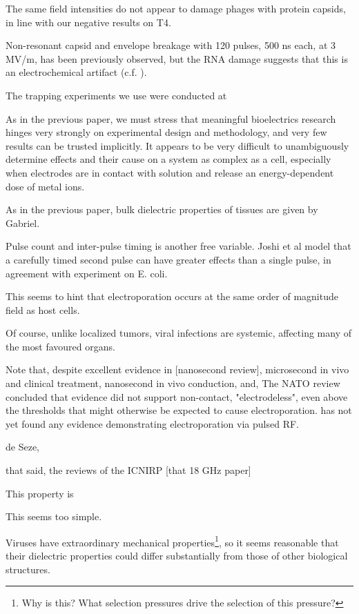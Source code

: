 \documentclass[fleqn,10pt]{paper}
\begin{document}
The same field intensities do not appear to damage phages with protein capsids\cite{Manipulation2013}, in line with our negative results on T4.

Non-resonant capsid and envelope breakage with 120 pulses, 500 ns each, at 3 MV/m, has been previously observed\cite{Inactivation1990}, but the RNA damage suggests that this is an electrochemical artifact \cite{Formation1996} (c.f. \cite{Microwave1987}). 

The trapping experiments we use were conducted at 

As in the previous paper, we must stress that meaningful bioelectrics research hinges very strongly on experimental design and methodology, and very few results can be trusted implicitly. It appears to be very difficult to unambiguously determine effects and their cause on a system as complex as a cell, especially when electrodes are in contact with solution and release an energy-dependent dose of metal ions.




As in the previous paper, bulk dielectric properties of tissues are given by Gabriel. 


Pulse count and inter-pulse timing is another free variable. Joshi et al \cite{Selfconsistent2001} model that a carefully timed second pulse can have greater effects than a single pulse, in agreement with experiment on E. coli.

This seems to hint that electroporation occurs at the same order of magnitude field as host cells.

Of course, unlike localized tumors, viral infections are systemic, affecting many of the most favoured organs. 



Note that, despite excellent evidence in [nanosecond review], microsecond in vivo and clinical treatment, nanosecond in vivo conduction, and, The NATO review concluded that evidence did not support non-contact, "electrodeless", even above the thresholds that might otherwise be expected to cause electroporation. has not yet found any evidence demonstrating electroporation via pulsed RF. 

de Seze, 

that said, the reviews of the ICNIRP [that 18 GHz  paper]

This property is 
\cite{Nanosecond2006b} 



This seems too simple.

Viruses have extraordinary mechanical properties\footnote{Why is this? What selection pressures drive the selection of this pressure?}, so it seems reasonable that their dielectric properties could differ substantially from those of other biological structures. 
\end{document}
